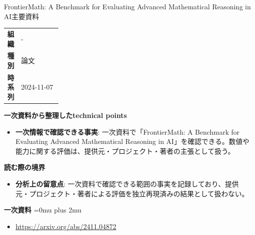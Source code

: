 \begin{technicalnote}{FrontierMath: A Benchmark for Evaluating Advanced Mathematical Reasoning in AI}{主要資料}
\begingroup
\begin{tabularx}{\linewidth}{@{}>{\bfseries}p{0.22\linewidth}X@{}}
組織 & - \\
種別 & 論文 \\
時系列 & 2024-11-07 \\
\end{tabularx}
\smallskip
{\bfseries 一次資料から整理したtechnical points}
\begin{itemize}[leftmargin=1.5em,itemsep=0.35em]
\item \textbf{一次情報で確認できる事実}: 一次資料で「FrontierMath: A Benchmark for Evaluating Advanced Mathematical Reasoning in AI」を確認できる。数値や能力に関する評価は、提供元・プロジェクト・著者の主張として扱う。
\end{itemize}
\begin{minipage}{\linewidth}
{\bfseries 読む際の境界}
\begin{itemize}[leftmargin=1.5em,itemsep=0.35em]
\item \textbf{分析上の留意点}: 一次資料で確認できる範囲の事実を記録しており、提供元・プロジェクト・著者による評価を独立再現済みの結果として扱わない。
\end{itemize}
\begin{samepage}
{\bfseries 一次資料}
\begingroup\sloppy
\Urlmuskip=0mu plus 2mu\relax
\begin{itemize}[leftmargin=1.5em,itemsep=0.25em]
\item {\scriptsize\url{https://arxiv.org/abs/2411.04872}}
\end{itemize}
\endgroup
\end{samepage}
\end{minipage}
\endgroup
\end{technicalnote}
\medskip

